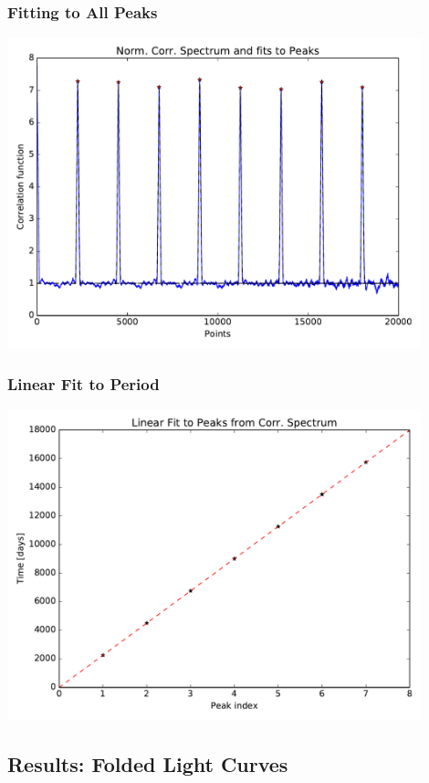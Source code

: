 \documentclass[notes]{beamer}
\begin{document}
\begin{frame}
\frametitle{Fitting to All Peaks}
\centering
\includegraphics[width=0.9\textwidth]{../figures/2019-1-15_16:2:14_peaks_TIC38846515.pdf}
\end{frame}

\begin{frame}
\frametitle{Linear Fit to Period}
\centering
\includegraphics[width=0.9\textwidth]{../figures/2019-1-15_16:2:14_linear_fit_TIC38846515.pdf}
\end{frame}

\subsection{Results: Folded Light Curves}
\end{document}
